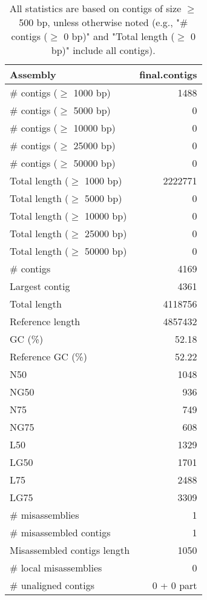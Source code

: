 \documentclass[12pt,a4paper]{article}
\begin{document}
\begin{table}[ht]
\begin{center}
\caption{All statistics are based on contigs of size $\geq$ 500 bp, unless otherwise noted (e.g., "\# contigs ($\geq$ 0 bp)" and "Total length ($\geq$ 0 bp)" include all contigs).}
\begin{tabular}{|l*{1}{|r}|}
\hline
Assembly & final.contigs \\ \hline
\# contigs ($\geq$ 1000 bp) & 1488 \\ \hline
\# contigs ($\geq$ 5000 bp) & 0 \\ \hline
\# contigs ($\geq$ 10000 bp) & 0 \\ \hline
\# contigs ($\geq$ 25000 bp) & 0 \\ \hline
\# contigs ($\geq$ 50000 bp) & 0 \\ \hline
Total length ($\geq$ 1000 bp) & 2222771 \\ \hline
Total length ($\geq$ 5000 bp) & 0 \\ \hline
Total length ($\geq$ 10000 bp) & 0 \\ \hline
Total length ($\geq$ 25000 bp) & 0 \\ \hline
Total length ($\geq$ 50000 bp) & 0 \\ \hline
\# contigs & 4169 \\ \hline
Largest contig & 4361 \\ \hline
Total length & 4118756 \\ \hline
Reference length & 4857432 \\ \hline
GC (\%) & 52.18 \\ \hline
Reference GC (\%) & 52.22 \\ \hline
N50 & 1048 \\ \hline
NG50 & 936 \\ \hline
N75 & 749 \\ \hline
NG75 & 608 \\ \hline
L50 & 1329 \\ \hline
LG50 & 1701 \\ \hline
L75 & 2488 \\ \hline
LG75 & 3309 \\ \hline
\# misassemblies & 1 \\ \hline
\# misassembled contigs & 1 \\ \hline
Misassembled contigs length & 1050 \\ \hline
\# local misassemblies & 0 \\ \hline
\# unaligned contigs & 0 + 0 part \\ \hline

\end{tabular}
\end{center}
\end{table}
\end{document}
